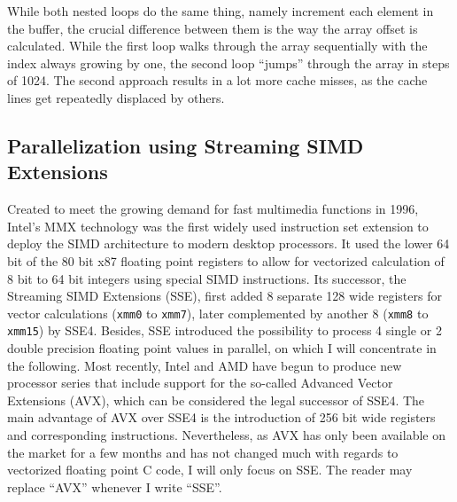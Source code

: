 While both nested loops do the same thing, namely increment each element in the buffer, the crucial difference between them is the way the array offset is calculated. While the first loop walks through the array sequentially with the index always growing by one, the second loop ``jumps'' through the array in steps of 1024. The second approach results in a lot more cache misses, as the cache lines get repeatedly displaced by others.

\subsection{Parallelization using Streaming SIMD Extensions}
Created to meet the growing demand for fast multimedia functions in 1996, Intel's MMX technology was the first widely used instruction set extension to deploy the SIMD architecture to modern desktop processors. It used the lower 64 bit of the 80 bit x87 floating point registers to allow for vectorized calculation of 8 bit to 64 bit integers using special SIMD instructions. Its successor, the Streaming SIMD Extensions (SSE), first added 8 separate 128 wide registers for vector calculations (\texttt{xmm0} to \texttt{xmm7}), later complemented by another 8 (\texttt{xmm8} to \texttt{xmm15}) by SSE4. Besides, SSE introduced the possibility to process 4 single or 2 double precision floating point values in parallel, on which I will concentrate in the following. Most recently, Intel and AMD have begun to produce new processor series that include support for the so-called Advanced Vector Extensions (AVX), which can be considered the legal successor of SSE4. The main advantage of AVX over SSE4 is the introduction of 256 bit wide registers and corresponding instructions. Nevertheless, as AVX has only been available on the market for a few months and has not changed much with regards to vectorized floating point C code, I will only focus on SSE. The reader may replace ``AVX'' whenever I write ``SSE''.

